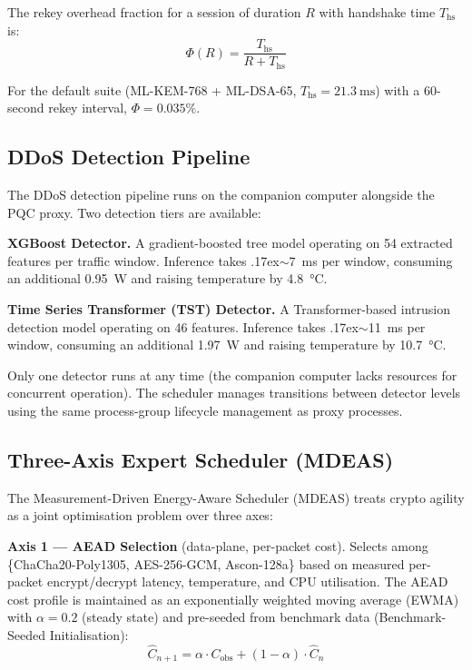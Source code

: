\documentclass[conference]{IEEEtran}
\begin{document}
The rekey overhead fraction for a session of duration $R$ with handshake time $T_{\mathrm{hs}}$ is:
\begin{equation}
\label{eq:rekey-overhead}
    \Phi(R) = \frac{T_{\mathrm{hs}}}{R + T_{\mathrm{hs}}}
\end{equation}

For the default suite (ML-KEM-768 + ML-DSA-65, $T_{\mathrm{hs}} = \SI{21.3}{\milli\second}$) with a 60-second rekey interval, $\Phi = 0.035\%$.

\subsection{DDoS Detection Pipeline}

The DDoS detection pipeline runs on the companion computer alongside the PQC proxy.
Two detection tiers are available:

\textbf{XGBoost Detector.}
A gradient-boosted tree model operating on 54 extracted features per traffic window.
Inference takes {\raise.17ex\hbox{$\scriptstyle\sim$}}\SI{7}{\milli\second} per window, consuming an additional \SI{0.95}{\watt} and raising temperature by \SI{4.8}{\celsius}.

\textbf{Time Series Transformer (TST) Detector.}
A Transformer-based intrusion detection model operating on 46 features.
Inference takes {\raise.17ex\hbox{$\scriptstyle\sim$}}\SI{11}{\milli\second} per window, consuming an additional \SI{1.97}{\watt} and raising temperature by \SI{10.7}{\celsius}.

Only one detector runs at any time (the companion computer lacks resources for concurrent operation).
The scheduler manages transitions between detector levels using the same process-group lifecycle management as proxy processes.

\subsection{Three-Axis Expert Scheduler (MDEAS)}
\label{sec:scheduler}

The Measurement-Driven Energy-Aware Scheduler (MDEAS) treats crypto agility as a joint optimisation problem over three axes:

\textbf{Axis 1 --- AEAD Selection} (data-plane, per-packet cost).
Selects among \{ChaCha20-Poly1305, AES-256-GCM, Ascon-128a\} based on measured per-packet encrypt/decrypt latency, temperature, and CPU utilisation.
The AEAD cost profile is maintained as an exponentially weighted moving average (EWMA) with $\alpha = 0.2$ (steady state) and pre-seeded from benchmark data (Benchmark-Seeded Initialisation):
\begin{equation}
\label{eq:ewma}
    \hat{C}_{n+1} = \alpha \cdot C_{\mathrm{obs}} + (1 - \alpha) \cdot \hat{C}_{n}
\end{equation}
\end{document}

